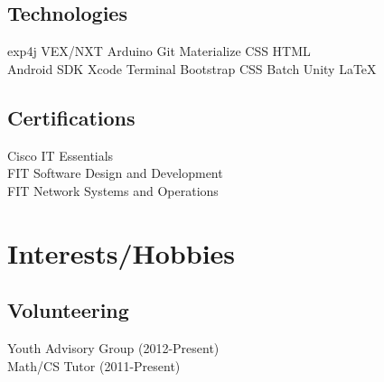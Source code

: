 \documentclass[]{deedy-resume-openfont}
\begin{document}
\begin{minipage}[t]{0.33\textwidth}
\subsection{Technologies}
exp4j \textbullet{}  VEX/NXT \textbullet{} Arduino \textbullet{} Git \textbullet{} Materialize CSS \textbullet{} HTML
\\ 
\vspace{1mm}
Android SDK \textbullet{} Xcode \textbullet{} Terminal \textbullet{}Bootstrap  \textbullet{} CSS \textbullet{} Batch \textbullet{} Unity
\textbullet{} \LaTeX
\sectionsep

\subsection{Certifications}
\textbullet{} Cisco IT Essentials\\
\textbullet{} FIT Software Design and Development \\
\textbullet{} FIT Network Systems and Operations \\
\sectionsep
\vspace{2mm}

\section{Interests/Hobbies}

\subsection{Volunteering}
\textbullet{} Youth Advisory Group (2012-Present)\\
\textbullet{} Math/CS Tutor (2011-Present)\\
\vspace{2mm}


\end{minipage}
\end{document}
